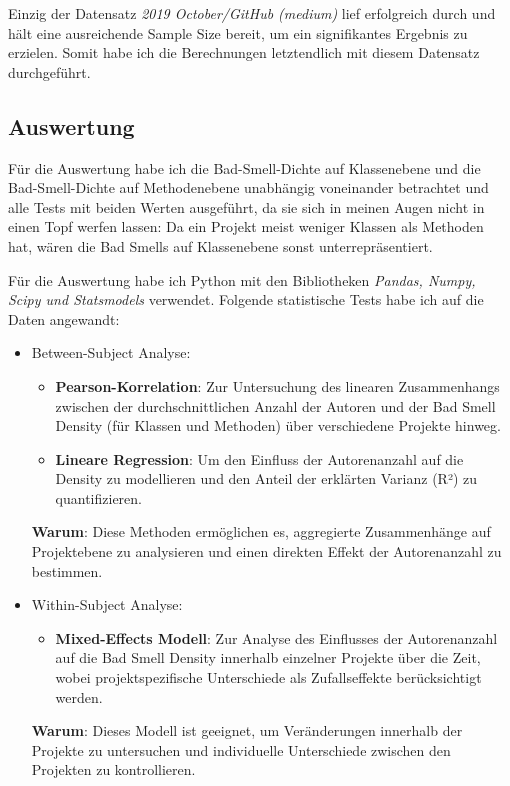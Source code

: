 \documentclass[12pt]{article}
\begin{document}
Einzig der Datensatz \emph{2019 October/GitHub (medium)} lief erfolgreich durch und hält eine ausreichende Sample Size bereit, um ein signifikantes Ergebnis zu erzielen.
Somit habe ich die Berechnungen letztendlich mit diesem Datensatz durchgeführt.

\subsection{Auswertung}
Für die Auswertung habe ich die Bad-Smell-Dichte auf Klassenebene und die Bad-Smell-Dichte auf Methodenebene unabhängig voneinander betrachtet und alle Tests mit beiden Werten ausgeführt, da sie sich in meinen Augen nicht in einen Topf werfen lassen:
Da ein Projekt meist weniger Klassen als Methoden hat, wären die Bad Smells auf Klassenebene sonst unterrepräsentiert.

Für die Auswertung habe ich Python mit den Bibliotheken \emph{Pandas, Numpy, Scipy und Statsmodels} verwendet.
Folgende statistische Tests habe ich auf die Daten angewandt:

\begin{itemize}
	\item Between-Subject Analyse:
	\begin{itemize}
		\item \textbf{Pearson-Korrelation}: Zur Untersuchung des linearen Zusammenhangs zwischen der durchschnittlichen Anzahl der Autoren und der Bad Smell Density (für Klassen und Methoden) über verschiedene Projekte hinweg.
		\item \textbf{Lineare Regression}: Um den Einfluss der Autorenanzahl auf die Density zu modellieren und den Anteil der erklärten Varianz (R²) zu quantifizieren.
	\end{itemize}
	\textbf{Warum}: Diese Methoden ermöglichen es, aggregierte Zusammenhänge auf Projektebene zu analysieren und einen direkten Effekt der Autorenanzahl zu bestimmen.
	
	\item Within-Subject Analyse:
	\begin{itemize}
		\item \textbf{Mixed-Effects Modell}: Zur Analyse des Einflusses der Autorenanzahl auf die Bad Smell Density innerhalb einzelner Projekte über die Zeit, wobei projektspezifische Unterschiede als Zufallseffekte berücksichtigt werden.
	\end{itemize}
	\textbf{Warum}: Dieses Modell ist geeignet, um Veränderungen innerhalb der Projekte zu untersuchen und individuelle Unterschiede zwischen den Projekten zu kontrollieren.
\end{itemize}
\end{document}
